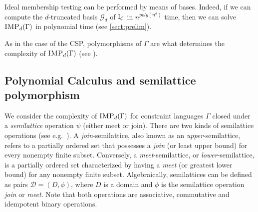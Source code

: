 \documentclass[11pt]{article}
\newcommand{\Cc}{\mathcal{C}}
\newcommand{\IMP}{\textsc{IMP}}
\newcommand{\I}{\emph{$\rm{I}$}}
\newcommand{\1}{\textbf{1}}
\newcommand{\GB}{\text{Gr\"{o}bner} }
\begin{document}
Ideal membership testing can be performed by means of \GB bases. Indeed, if we can compute the $d$-truncated \GB basis $\mathcal{G}_d$ of $\I_\Cc$ in $n^{poly(n^d)}$ time, then we can solve $\IMP_d(\Gamma)$ in polynomial time (see \cref{sect:prelim}).
%

As in the case of the CSP, polymorphisms of $\Gamma$ are what determines the complexity of $\IMP_d(\Gamma)$ (see \cite{Mastrolilli21TALG,BharathiM21, BulatovRSTOC22}). 
 

\subsection{Polynomial Calculus and semilattice polymorphism}\label{sect:PCsemilattice}

We consider the complexity of $\IMP_d(\Gamma)$ for constraint languages $\Gamma$ closed under a \emph{semilattice} operation $\psi$ (either meet or join). 
There are two kinds of semilattice operations (see e.g.~\cite{Davey_Priestley_2002}). A \emph{join}-semilattice, also known as an \emph{upper}-semilattice, refers to a partially ordered set that possesses a \emph{join} (or least upper bound) for every nonempty finite subset. Conversely, a \emph{meet}-semilattice, or \emph{lower}-semilattice, is a partially ordered set characterized by having a \emph{meet} (or greatest lower bound) for any nonempty finite subset. 
%
Algebraically, semilattices can be defined {as pairs $\mathcal{D} = (D,\phi)$, where $D$ is a domain and $\phi$ is the semilattice operation \textit{join} or \textit{meet}. Note that both operations are associative, commutative and idempotent binary operations.} 
\end{document}
